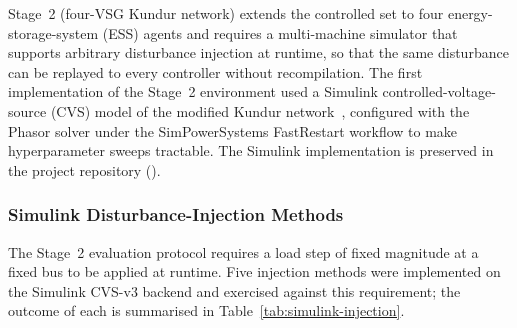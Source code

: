 \documentclass{unnc-fyp}
\begin{document}
Stage~2 (four-VSG Kundur network) extends the controlled set to
four energy-storage-system (ESS) agents and requires a
multi-machine simulator that supports arbitrary disturbance
injection at runtime, so that the same disturbance can be replayed
to every controller without recompilation.
The first implementation of the Stage~2 environment used a
Simulink controlled-voltage-source (CVS) model of the modified
Kundur network~\cite{kundur1994power}, configured with the Phasor
solver under the SimPowerSystems FastRestart workflow to make
hyperparameter sweeps tractable.
The Simulink implementation is preserved in the project
repository
().

\subsubsection{Simulink Disturbance-Injection Methods}

The Stage~2 evaluation protocol requires a load step of fixed
magnitude at a fixed bus to be applied at runtime.
Five injection methods were implemented on the Simulink CVS-v3
backend and exercised against this requirement; the outcome of
each is summarised in Table~\ref{tab:simulink-injection}.
\end{document}
